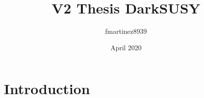 \documentclass{article}
\title{V2 Thesis DarkSUSY}
\author{fmartinez8939 }
\date{April 2020}
\begin{document}
\maketitle

\section{Introduction}
\end{document}
